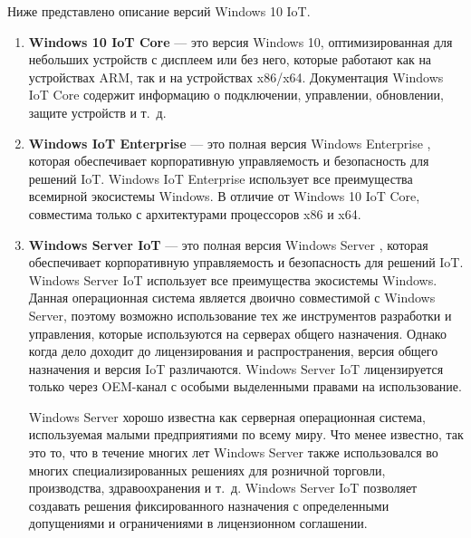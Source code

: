 Ниже представлено описание версий Windows 10 IoT.

\begin{enumerate}[label*=\arabic*.]
	\item \textbf{Windows 10 IoT Core} \cite{Windows_IoT_Core} --- это версия Windows 10, оптимизированная для небольших устройств с дисплеем или без него, которые работают как на устройствах ARM, так и на устройствах x86/x64. Документация Windows IoT Core содержит информацию о подключении, управлении, обновлении, защите устройств и т.~д.
	
	\item \textbf{Windows IoT Enterprise} \cite{Windows_IoT_Enterprice} --- это полная версия Windows Enterprise \cite{Windows_Enterprice}, которая обеспечивает корпоративную управляемость и безопасность для решений IoT. Windows IoT Enterprise использует все преимущества всемирной экосистемы Windows. В отличие от Windows 10 IoT Core, совместима только с архитектурами процессоров x86 и x64.
	
	\item \textbf{Windows Server IoT} \cite{Windows_IoT_Server} --- это полная версия Windows Server \cite{Windows_Server}, которая обеспечивает корпоративную управляемость и безопасность для решений IoT. Windows Server IoT использует все преимущества экосистемы Windows. Данная операционная система является двоично совместимой \cite{Olifer} с Windows Server, поэтому возможно использование тех же инструментов разработки и управления, которые используются на серверах общего назначения. Однако когда дело доходит до лицензирования и распространения, версия общего назначения и версия IoT различаются. Windows Server IoT лицензируется только через OEM-канал с особыми выделенными правами на использование.
	
	Windows Server хорошо известна как серверная операционная система, используемая малыми предприятиями по всему миру. Что менее известно, так это то, что в течение многих лет Windows Server также использовался во многих специализированных решениях для розничной торговли, производства, здравоохранения и т.~д. Windows Server IoT позволяет создавать решения фиксированного назначения с определенными допущениями и ограничениями в лицензионном соглашении.
\end{enumerate}




